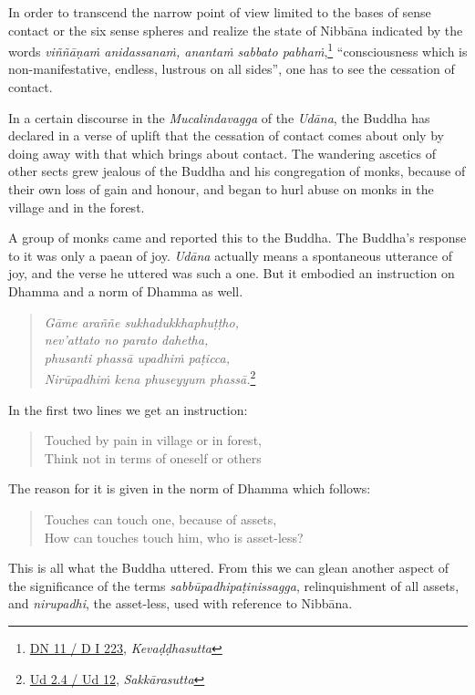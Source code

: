 In order to transcend the narrow point of view limited to the bases of sense contact or the six sense spheres and realize the state of Nibbāna indicated by the words \emph{viññāṇaṁ anidassanaṁ, anantaṁ sabbato pabhaṁ},\footnote{\href{https://suttacentral.net/dn11/pli/ms}{DN 11 / D I 223}, \emph{Kevaḍḍhasutta}} ``consciousness which is non-manifestative, endless, lustrous on all sides'', one has to see the cessation of contact.

In a certain discourse in the \emph{Mucalindavagga} of the \emph{Udāna}, the Buddha has declared in a verse of uplift that the cessation of contact comes about only by doing away with that which brings about contact. The wandering ascetics of other sects grew jealous of the Buddha and his congregation of monks, because of their own loss of gain and honour, and began to hurl abuse on monks in the village and in the forest.

A group of monks came and reported this to the Buddha. The Buddha's response to it was only a paean of joy. \emph{Udāna} actually means a spontaneous utterance of joy, and the verse he uttered was such a one. But it embodied an instruction on Dhamma and a norm of Dhamma as well.

\clearpage

\begin{quote}
\emph{Gāme araññe sukhadukkhaphuṭṭho,}\\
\emph{nev'attato no parato dahetha,}\\
\emph{phusanti phassā upadhiṁ paṭicca,}\\
\emph{Nirūpadhiṁ kena phuseyyum phassā.}\footnote{\href{https://suttacentral.net/ud2.4/pli/ms}{Ud 2.4 / Ud 12}, \emph{Sakkārasutta}}
\end{quote}

In the first two lines we get an instruction:

\begin{quote}
Touched by pain in village or in forest,\\
Think not in terms of oneself or others
\end{quote}

The reason for it is given in the norm of Dhamma which follows:

\begin{quote}
Touches can touch one, because of assets,\\
How can touches touch him, who is asset-less?
\end{quote}

This is all what the Buddha uttered. From this we can glean another aspect of the significance of the terms \emph{sabbūpadhipaṭinissagga}, relinquishment of all assets, and \emph{nirupadhi}, the asset-less, used with reference to Nibbāna.

